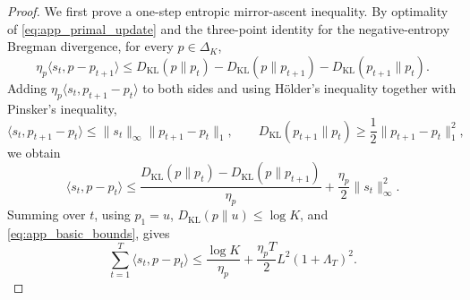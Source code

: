 \begin{proof}
We first prove a one-step entropic mirror-ascent inequality. By optimality of \eqref{eq:app_primal_update} and the three-point identity for the negative-entropy Bregman divergence, for every $p\in\Delta_K$,
\begin{equation}
    \eta_p\langle s_t,p-p_{t+1}\rangle
    \le
    D_{\mathrm{KL}}(p\|p_t)
    -D_{\mathrm{KL}}(p\|p_{t+1})
    -D_{\mathrm{KL}}(p_{t+1}\|p_t).
    \label{eq:app_three_point}
\end{equation}
Adding $\eta_p\langle s_t,p_{t+1}-p_t\rangle$ to both sides and using H\"older's inequality together with Pinsker's inequality,
\begin{equation}
    \langle s_t,p_{t+1}-p_t\rangle
    \le
    \|s_t\|_\infty\|p_{t+1}-p_t\|_1,
    \qquad
    D_{\mathrm{KL}}(p_{t+1}\|p_t)
    \ge
    \frac{1}{2}\|p_{t+1}-p_t\|_1^2,
\end{equation}
we obtain
\begin{equation}
    \langle s_t,p-p_t\rangle
    \le
    \frac{
        D_{\mathrm{KL}}(p\|p_t)
        -D_{\mathrm{KL}}(p\|p_{t+1})
    }{\eta_p}
    +
    \frac{\eta_p}{2}\|s_t\|_\infty^2.
    \label{eq:app_mirror_one_step}
\end{equation}
Summing over $t$, using $p_1=u$, $D_{\mathrm{KL}}(p\|u)\le\log K$, and \eqref{eq:app_basic_bounds}, gives
\begin{equation}
    \sum_{t=1}^T\langle s_t,p-p_t\rangle
    \le
    \frac{\log K}{\eta_p}
    +
    \frac{\eta_p T}{2}L^2(1+\Lambda_T)^2.
    \label{eq:app_mirror_sum}
\end{equation}


\end{proof}
